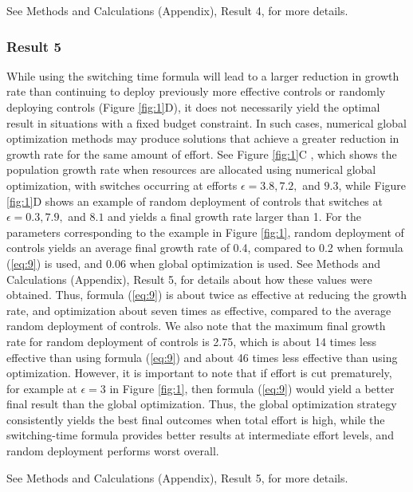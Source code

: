 \documentclass[onecolumn]{article}
\begin{document}
See Methods and Calculations (Appendix), Result 4, for more details.

\subsubsection*{Result 5}
While using the switching time formula will lead to a larger reduction in growth rate than continuing to deploy previously more effective controls or randomly deploying controls (Figure \ref{fig:1}D), it does not necessarily yield the optimal result in situations with a fixed budget constraint. In such cases, numerical global optimization methods may produce solutions that achieve a greater reduction in growth rate for the same amount of effort. See Figure \ref{fig:1}C , which shows the population growth rate when resources are allocated using numerical global optimization, with switches occurring at efforts $\epsilon=3.8, 7.2,$ and $9.3$, while Figure \ref{fig:1}D shows an example of random deployment of controls that switches at $\epsilon=0.3, 7.9,$ and $8.1$ and yields a final growth rate larger than 1.
For the parameters corresponding to the example in Figure \ref{fig:1}, random deployment of controls yields an average final growth rate of 0.4, compared to 0.2 when formula (\ref{eq:9}) is used, and 0.06 when global optimization is used. See Methods and Calculations (Appendix), Result 5, for details about how these values were obtained. Thus, formula (\ref{eq:9}) is about twice as effective at reducing the growth rate, and optimization about seven times as effective, compared to the average random deployment of controls. We also note that the maximum final growth rate for random deployment of controls is 2.75, which is about 14 times less effective than using formula (\ref{eq:9}) and about 46 times less effective than using optimization. However, it is important to note that if effort is cut prematurely, for example at $\epsilon=3$ in Figure \ref{fig:1}, then formula (\ref{eq:9}) would yield a better final result than the global optimization. Thus, the global optimization strategy consistently yields the best final outcomes when total effort is high, while the switching-time formula provides better results at intermediate effort levels, and random deployment performs worst overall.

See Methods and Calculations (Appendix), Result 5, for more details.
\end{document}
